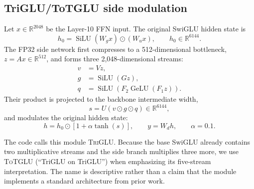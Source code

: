 \documentclass[10pt]{article}
\newcommand{\TriGLU}{\textsc{TriGLU}}
\newcommand{\ToTGLU}{\textsc{ToTGLU}}
\begin{document}
\subsection{TriGLU/ToTGLU side modulation}

Let $x\in\mathbb{R}^{2048}$ be the Layer-10 FFN input.  The original SwiGLU
hidden state is
\begin{equation}
  h_0 = \operatorname{SiLU}(W_g x) \odot (W_u x),
  \qquad h_0\in\mathbb{R}^{6144}.
\end{equation}
The FP32 side network first compresses to a 512-dimensional bottleneck,
$z=A x\in\mathbb{R}^{512}$, and forms three 2,048-dimensional streams:
\begin{align}
  v &= Vz, \\
  g &= \operatorname{SiLU}(Gz), \\
  q &= \operatorname{SiLU}\!\left(F_2\operatorname{GeLU}(F_1z)\right).
\end{align}
Their product is projected to the backbone intermediate width,
\begin{equation}
  s = U(v\odot g\odot q)\in\mathbb{R}^{6144},
\end{equation}
and modulates the original hidden state:
\begin{equation}
  h = h_0 \odot \left[1 + \alpha\tanh(s)\right],
  \qquad
  y = W_d h,
  \qquad \alpha=0.1.
  \label{eq:triglu}
\end{equation}

The code calls this module \TriGLU{}.  Because the base SwiGLU already contains
two multiplicative streams and the side branch multiplies three more, we use
\ToTGLU{} (``TriGLU on TriGLU'') when emphasizing its five-stream
interpretation.  The name is descriptive rather than a claim that the module
implements a standard architecture from prior work.
\end{document}

